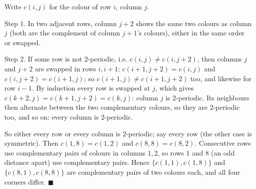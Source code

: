 Write $c(i,j)$ for the colour of row $i$, column $j$.

Step 1. In two adjacent rows, column $j+2$ shows the same two colours as column $j$ (both are the complement of column $j+1$'s colours), either in the same order or swapped.

Step 2. If some row is not $2$-periodic, i.e. $c(i,j)\ne c(i,j+2)$, then columns $j$ and $j+2$ are swapped in rows $i,i+1$: $c(i+1,j+2)=c(i,j)$ and $c(i,j+2)=c(i+1,j)$; so $c(i+1,j)\ne c(i+1,j+2)$ too, and likewise for row $i-1$. By induction every row is swapped at $j$, which gives $c(k+2,j)=c(k+1,j+2)=c(k,j)$: column $j$ is $2$-periodic. Its neighbours then alternate between the two complementary colours, so they are $2$-periodic too, and so on: every column is $2$-periodic.

So either every row or every column is $2$-periodic; say every row (the other case is symmetric). Then $c(1,8)=c(1,2)$ and $c(8,8)=c(8,2)$. Consecutive rows use complementary pairs of colours in columns $1,2$, so rows $1$ and $8$ (an odd distance apart) use complementary pairs. Hence $\{c(1,1),c(1,8)\}$ and $\{c(8,1),c(8,8)\}$ are complementary pairs of two colours each, and all four corners differ. $\blacksquare$
